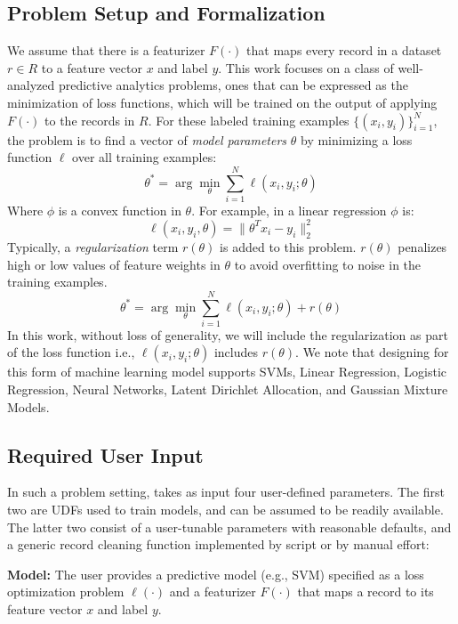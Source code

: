 \subsection{Problem Setup and Formalization}
We assume that there is a featurizer $F(\cdot)$ that maps every record in a dataset $r \in R$ to a feature vector $x$ and label $y$.
This work focuses on a class of well-analyzed predictive analytics problems, ones that can be expressed as the minimization of loss functions, which will be trained on the output of applying $F(\cdot)$ to the records in $R$.
For these labeled training examples $\{(x_{i},y_{i})\}_{i=1}^{N}$, the problem is to find a vector of \emph{model parameters} $\theta$ by minimizing a loss function $\ell$ over all training examples:
\[
 \theta^{*}=\arg\min_{\theta}\sum_{i=1}^{N}\ell(x_{i},y_{i};\theta)
\]
Where $\phi$ is a convex function in $\theta$.
For example, in a linear regression $\phi$ is:
\[
\ell(x_{i},y_{i},\theta) = \|\theta^Tx_{i} - y_i \|_2^2
\]
Typically, a \emph{regularization} term $r(\theta)$ is added to this problem.
$r(\theta)$ penalizes high or low values of feature weights in $\theta$ to avoid overfitting to noise in the training examples.
\begin{equation}
 \theta^{*}=\arg\min_{\theta}\sum_{i=1}^{N}\ell(x_{i},y_{i};\theta) + r(\theta)
 \label{ideal}
\end{equation}
In this work, without loss of generality, we will include the regularization as part of the loss function i.e., $\ell(x_{i},y_{i};\theta)$ includes $r(\theta)$.
We note that designing \sys for this form of machine learning model supports SVMs, Linear Regression, Logistic Regression, Neural Networks, Latent Dirichlet Allocation, and Gaussian Mixture Models.

\subsection{Required User Input}\label{uinp}
In such a problem setting, \sys takes as input four user-defined parameters.  The first two are UDFs used to train models, and can be assumed to be readily available.  
The latter two consist of a user-tunable parameters with reasonable defaults,
and a generic record cleaning function implemented by script or by manual effort:

\noindent\textbf{Model:} The user provides a predictive model (e.g., SVM) specified as a loss optimization problem $\ell(\cdot)$ and a featurizer $F(\cdot)$ that maps a record to its feature vector $x$ and label $y$.

